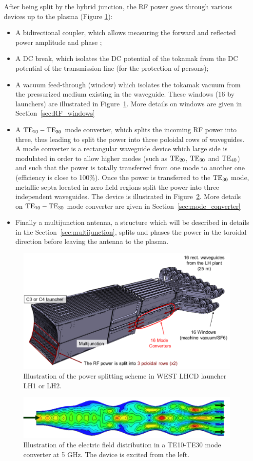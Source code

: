 After being split by the hybrid junction, the RF power goes through various devices up to the plasma (Figure \ref{fig:toresuprac4cad}): 
\begin{itemize}
	\item A bidirectional coupler, which allows measuring the forward and reflected power amplitude and phase ;
	\item A DC break, which isolates the DC potential of the tokamak from the DC potential of the transmission line (for the protection of persons);
	\item A vacuum feed-through (window) which isolates the tokamak vacuum from the pressurized medium existing in the waveguide. These windows (16 by launchers) are illustrated in Figure~\ref{fig:toresuprac4cad}. More details on windows are given in Section~\ref{sec:RF_windows}
	\item A ${\mathrm{TE}}_{10}-{\mathrm{TE}}_{30}$ mode converter, which splits the incoming RF power into three, thus leading to split the power into three poloidal rows of waveguides. A mode converter is a rectangular waveguide device which large side is modulated in order to allow higher modes (such as ${\mathrm{TE}}_{20}$, ${\mathrm{TE}}_{30}$ and ${\mathrm{TE}}_{40}$) and such that the power is totally transferred from one mode to another one (efficiency is close to 100\%). Once the power is transferred to the ${\mathrm{TE}}_{30}$ mode, metallic septa located in zero field regions split the power into three independent waveguides. The device is illustrated in Figure~\ref{fig:modeconverter}. More details on ${\mathrm{TE}}_{10}-{\mathrm{TE}}_{30}$ mode converter are given in Section~\ref{sec:mode_converter}
	\item Finally a multijunction antenna, a structure which will be described in details in the Section~\ref{sec:multijunction}, splits and phases the power in the toroidal direction before leaving the antenna to the plasma. 
\end{itemize}


\begin{figure}
	\centering
	\includegraphics[width=0.9\linewidth]{figures/chap1/ToreSupra_C4_CAD}
	\caption{Illustration of the power splitting scheme in WEST LHCD launcher LH1 or LH2.}
	\label{fig:toresuprac4cad}
\end{figure}


\begin{figure}
	\centering
	\includegraphics[width=0.9\linewidth]{figures/chap1/ModeConverter}
	\caption{Illustration of the electric field distribution in a TE10-TE30 mode converter at 5 GHz. The device is excited from the left.}
	\label{fig:modeconverter}
\end{figure}
